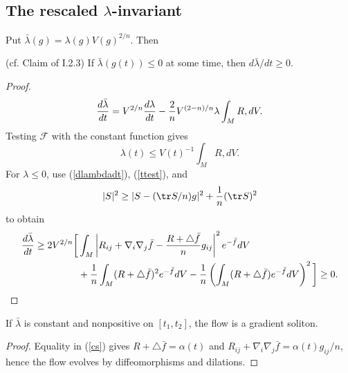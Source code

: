 \subsection{The rescaled $\lambda$-invariant}

Put $\bar\lambda(g)=\lambda(g)V(g)^{2/n}$. Then
\begin{proposition}
  \label{prop:kl-rescaled-invariant-monotonicity-rescaled-lambda-invariant}
  \label{expandingprop} (cf. Claim of I.2.3)
If $\bar\lambda(g(t))\le0$ at some time, then $d\bar\lambda/dt\ge0$.
\end{proposition}
\begin{proof}
\sketch
\begin{equation}
{d\bar\lambda\over dt}=V^{2/n}{d\lambda\over dt}-{2\over n}V^{(2-n)/n}\lambda\int_MR,dV.
\end{equation}
Testing ${\mathcal F}$ with the constant function gives
\begin{equation}\label{ttest}\lambda(t)\le V(t)^{-1}\int_MR,dV.
\end{equation}
For $\lambda\le0$, use (\ref{dlambdadt}), (\ref{ttest}), and
\[|S|^2\ge|S-({\tr S/n})g|^2+{1\over n}(\tr S)^2\]
to obtain
\begin{align}\label{cs}
{d\bar\lambda\over dt}\ge2V^{2/n}\bigg[&\int_M\left|R_{ij}+\nabla_i\nabla_j\bar f-{R+\triangle\bar f\over n}g_{ij}\right|^2e^{-\bar f}dV\\
&+{1\over n}\int_M(R+\triangle\bar f)^2e^{-\bar f}dV-{1\over n}\left(\int_M(R+\triangle\bar f)e^{-\bar f}dV\right)^2\bigg]\ge0.
\end{align}
\end{proof}

\begin{corollary}
  \label{cor:kl-rescaled-invariant-rigidity-at-constant-rescaled-lambda}
  \label{expp}
If $\bar\lambda$ is constant and nonpositive on $[t_1,t_2]$, the flow is a
gradient soliton.
\end{corollary}
\begin{proof}
\sketch
Equality in (\ref{cs}) gives $R+\triangle\bar f=\alpha(t)$ and
$R_{ij}+\nabla_i\nabla_j\bar f=\alpha(t)g_{ij}/n$, hence the flow evolves by
diffeomorphisms and dilations.
\end{proof}


